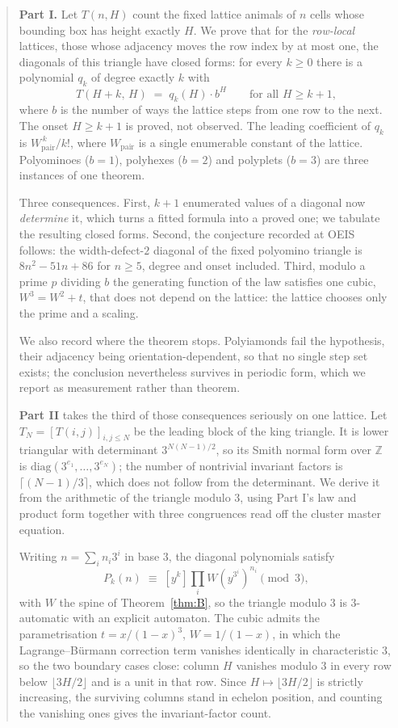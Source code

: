 \documentclass[11pt]{article}
\newcommand{\Wp}{W_{\mathrm{pair}}}
\newcommand{\Z}{\mathbb{Z}}
\begin{document}
\begin{abstract}
\noindent
\textbf{Part I.}
Let $T(n,H)$ count the fixed lattice animals of $n$ cells whose bounding box has
height exactly $H$. We prove that for the \emph{row-local} lattices, those whose
adjacency moves the row index by at most one,
the diagonals of this triangle have closed forms: for every $k \ge 0$ there is a
polynomial $q_k$ of degree exactly $k$ with
\[
  T(H+k,\,H) \;=\; q_k(H)\cdot b^{H}
  \qquad\text{for all } H \ge k+1,
\]
where $b$ is the number of ways the lattice steps from one row to the next. The
onset $H \ge k+1$ is proved, not observed. The leading coefficient of $q_k$ is
$\Wp^{\,k}/k!$, where $\Wp$ is a single enumerable constant of the lattice.
Polyominoes ($b=1$), polyhexes ($b=2$) and polyplets ($b=3$) are three
instances of one theorem.

Three consequences. First, $k+1$ enumerated values of a diagonal now
\emph{determine} it, which turns a fitted formula into a proved one; we tabulate
the resulting closed forms. Second, the
conjecture recorded at OEIS  follows: the width-defect-$2$
diagonal of the fixed polyomino triangle is $8n^2-51n+86$ for $n \ge 5$, degree
and onset included. Third, modulo a prime $p$ dividing $b$ the
generating function of the law satisfies one cubic, $W^3 = W^2 + t$, that does
not depend on the lattice: the lattice chooses only the prime and a scaling.

We also record where the theorem stops. Polyiamonds fail the hypothesis, their
adjacency being orientation-dependent, so that no single step set exists; the
conclusion nevertheless survives in periodic form, which we report as
measurement rather than theorem.

\textbf{Part II} takes the third of those consequences seriously on one
lattice. Let $T_N = [T(i,j)]_{i,j \le N}$ be the leading block of the king
triangle. It is lower triangular with determinant $3^{N(N-1)/2}$, so its Smith
normal form over $\Z$ is $\mathrm{diag}(3^{e_1},\dots,3^{e_N})$; the number of
nontrivial invariant factors is $\lceil (N-1)/3\rceil$, which does not follow
from the determinant. We derive it from the arithmetic of the triangle modulo
$3$, using Part I's law and product form together with three congruences read
off the cluster master equation.

Writing $n = \sum_i n_i 3^i$ in base $3$, the diagonal polynomials satisfy
\[
  P_k(n) \;\equiv\; [y^k]\prod_i W\!\left(y^{3^i}\right)^{n_i} \pmod 3 ,
\]
with $W$ the spine of Theorem~\ref{thm:B}, so the triangle modulo $3$ is
$3$-automatic with an explicit automaton. The cubic admits the parametrisation
$t = x/(1-x)^3$, $W = 1/(1-x)$, in which the Lagrange--B\"urmann correction term
vanishes identically in characteristic $3$, so the two boundary cases close:
column $H$ vanishes modulo $3$ in every row below $\lfloor 3H/2\rfloor$ and is a
unit in that row. Since $H \mapsto \lfloor 3H/2\rfloor$ is strictly increasing,
the surviving columns stand in echelon position, and counting the vanishing ones
gives the invariant-factor count.


\end{abstract}
\end{document}
